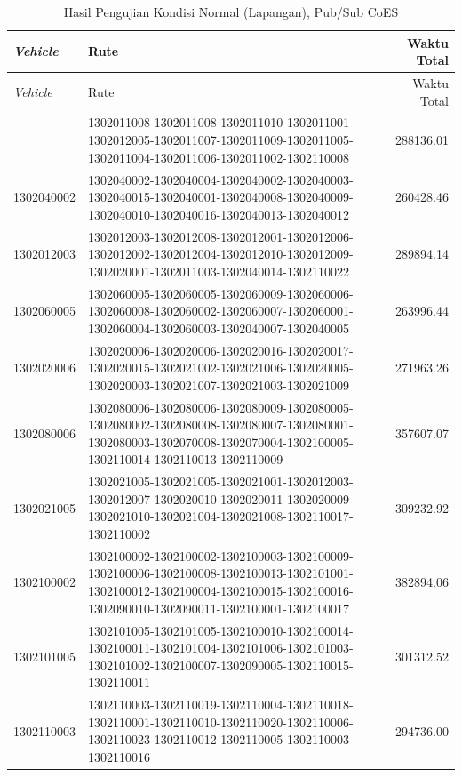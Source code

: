 \begin{longtable}[h]{lp{8cm}r}
	\caption{Hasil Pengujian Kondisi Normal (Lapangan), Pub/Sub CoES}
	\label{tbl:test_result_normal_field_pubsub_coes}\\
	\toprule
		\textit{Vehicle} & Rute & Waktu Total\\ 
	\midrule
	\endfirsthead
	\toprule
		\textit{Vehicle} & Rute & Waktu Total\\ 
	\midrule
	\endhead
	\bottomrule
	\endfoot
		1302011008 & 1302011008-1302011008-1302011010-1302011001-1302012005-1302011007-1302011009-1302011005-1302011004-1302011006-1302011002-1302110008 & 288136.01 \\
		1302040002 & 1302040002-1302040004-1302040002-1302040003-1302040015-1302040001-1302040008-1302040009-1302040010-1302040016-1302040013-1302040012 & 260428.46 \\
		1302012003 & 1302012003-1302012008-1302012001-1302012006-1302012002-1302012004-1302012010-1302012009-1302020001-1302011003-1302040014-1302110022 & 289894.14 \\
		1302060005 & 1302060005-1302060005-1302060009-1302060006-1302060008-1302060002-1302060007-1302060001-1302060004-1302060003-1302040007-1302040005 & 263996.44 \\
		1302020006 & 1302020006-1302020006-1302020016-1302020017-1302020015-1302021002-1302021006-1302020005-1302020003-1302021007-1302021003-1302021009 & 271963.26 \\
		1302080006 & 1302080006-1302080006-1302080009-1302080005-1302080002-1302080008-1302080007-1302080001-1302080003-1302070008-1302070004-1302100005-1302110014-1302110013-1302110009 & 357607.07 \\
		1302021005 & 1302021005-1302021005-1302021001-1302012003-1302012007-1302020010-1302020011-1302020009-1302021010-1302021004-1302021008-1302110017-1302110002 & 309232.92 \\
		1302100002 & 1302100002-1302100002-1302100003-1302100009-1302100006-1302100008-1302100013-1302101001-1302100012-1302100004-1302100015-1302100016-1302090010-1302090011-1302100001-1302100017 & 382894.06 \\
		1302101005 & 1302101005-1302101005-1302100010-1302100014-1302100011-1302101004-1302101006-1302101003-1302101002-1302100007-1302090005-1302110015-1302110011 & 301312.52 \\
		1302110003 & 1302110003-1302110019-1302110004-1302110018-1302110001-1302110010-1302110020-1302110006-1302110023-1302110012-1302110005-1302110003-1302110016 & 294736.00 \\

\end{longtable}
